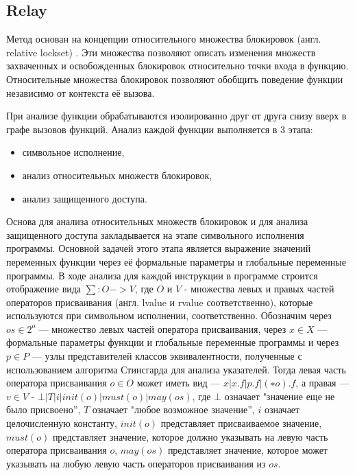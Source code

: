 \subsection{Relay}

Метод основан на концепции относительного множества блокировок (англ. relative lockset) \cite{Relay}. Эти множества позволяют описать изменения множеств захваченных и освобожденных блокировок относительно точки входа в функцию. Относительные множества блокировок позволяют обобщить поведение функции независимо от контекста её вызова.

При анализе функции обрабатываются изолированно друг от друга снизу вверх в графе вызовов функций. Анализ каждой функции выполняется в 3 этапа:

\begin{itemize}
  \item символьное исполнение,
  \item анализ относительных множеств блокировок,
  \item анализ защищенного доступа.
\end{itemize}

Основа для анализа относительных множеств блокировок и для анализа защищенного доступа закладывается на этапе символьного исполнения программы. Основной задачей этого этапа является выражение значений переменных функции через её формальные параметры и глобальные переменные программы. В ходе анализа для каждой инструкции в программе строится отображение вида $\sum: O->V$, где $O$ и $V$ - множества левых и правых частей операторов присваивания (англ. lvalue и rvalue соответственно), которые используются при символьном исполнении, соответственно. Обозначим через $os \in 2^{o}$ —  множество левых частей оператора присваивания, через $x \in X$  — формальные параметры функции и глобальные переменные программы и через $p \in P$ — узлы представителей классов эквивалентности, полученные с использованием алгоритма Стинсгарда для анализа указателей. Тогда левая часть оператора присваивания $o \in O$  может иметь вид — $x | x.f | p.f | (∗o).f$, а правая — $v \in V$ - $⊥ | T | i | init(o) | must(o) | may(os)$, где $⊥$ означает "значение еще не было присвоено”, $T$ означает "любое возможное значение”, $i$ означает целочисленную константу, $init(o)$  представляет присваиваемое значение, $must(o)$ представляет значение, которое должно указывать на левую часть оператора присваивания $o$, $may(os)$ представляет значение, которое может указывать на любую левую часть операторов присваивания из $os$.

